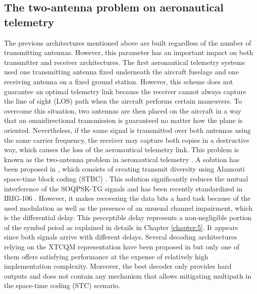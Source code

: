 \subsection*{The two-antenna problem on aeronautical telemetry}
The previous architectures mentioned above are built regardless of the number of transmitting antennas. However, this parameter has an important impact on both transmitter and receiver architectures. The first aeronautical telemetry systems used one transmitting antenna fixed underneath the aircraft fuselage and one receiving antenna on a fixed ground station. However, this scheme does not guarantee an optimal telemetry link because the receiver cannot always capture the line of sight (LOS) path when the aircraft performs certain maneuvers. To overcome this situation, two antennas are then placed on the aircraft in a way that an omnidirectional transmission is guaranteed no matter how the plane is oriented. Nevertheless, if the same signal is transmitted over both antennas using the same carrier frequency, the receiver may capture both copies in a destructive way, which causes the loss of the aeronautical telemetry link. This problem is known as the two-antenna problem in aeronautical telemetry \cite{two_ant_pblm1}. A solution has been proposed in \cite{jensen}, which consists of creating transmit diversity using Alamouti space-time block coding (STBC) \cite{alamouti}. This solution significantly reduces the mutual interference of the SOQPSK-TG signals and has been recently standardized in IRIG-106 \cite{irig106}. However, it makes recovering the data bits a hard task because of the used modulation as well as the presence of an unusual channel impairment, which is the differential delay. This perceptible delay represents a non-negligible portion of the symbol peiod as explained in details in Chapter \ref{chapter:5}. It appears since both signals arrive with different delays. Several decoding architectures relying on the XTCQM representation have been proposed in \cite{these_nelson, stc_decoder} but only one of them offers satisfying performance at the expense of relatively high implementation complexity. Moreover, the best decoder only provides hard outputs and does not contain any mechanism that allows mitigating multipath in the space-time coding (STC) scenario. 

